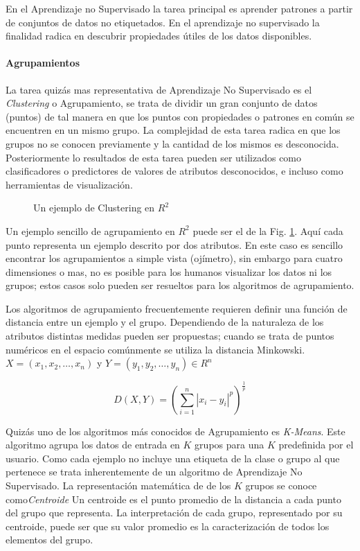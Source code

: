 En el Aprendizaje no Supervisado la tarea principal es aprender patrones a partir de conjuntos de datos no etiquetados. En el aprendizaje no supervisado la finalidad radica en descubrir propiedades útiles de los datos disponibles.

\paragraph{Agrupamientos}

La tarea quizás mas representativa de Aprendizaje No Supervisado es el \textit{Clustering} o Agrupamiento, se trata de dividir un gran conjunto de datos (puntos) de tal manera en que los puntos con propiedades o patrones en común se encuentren en un mismo grupo. La complejidad de esta tarea radica en que los grupos no se conocen previamente y la cantidad de los mismos es desconocida. Posteriormente lo resultados de esta tarea pueden ser utilizados como clasificadores o predictores de valores de atributos desconocidos, e incluso como herramientas de visualización. \cite{kubat_introduction_2017}

 \begin{figure}[htbp]
   \centering
   
    \caption{Un ejemplo de Clustering en $R^2$}
    \label{fig:clustering-example}
\end{figure}

Un ejemplo sencillo de agrupamiento en $R^2$ puede ser el de la Fig. \ref{fig:clustering-example}. Aquí cada punto representa un ejemplo descrito por dos atributos. En este caso es sencillo encontrar los agrupamientos a simple vista (ojímetro), sin embargo para cuatro dimensiones o mas, no es posible para los humanos visualizar los datos ni los grupos; estos casos solo pueden ser resueltos para los algoritmos de agrupamiento. \cite{kubat_introduction_2017}

Los algoritmos de agrupamiento frecuentemente requieren definir una función de distancia entre un ejemplo y el grupo. Dependiendo de la naturaleza de los atributos distintas medidas pueden ser propuestas; cuando se trata de puntos numéricos en el espacio comúnmente se utiliza la distancia Minkowski. $X = (x_1,x_2,\ldots,x_n)$ y $Y=(y_1,y_2,\ldots ,y_n) \in R^n$
 
$$D(X,Y) = (\sum_{i=1}^{n}|x_{i}-y_{i}|^{p})^{\frac{1}{p}}$$

Quizás uno de los algoritmos más conocidos de Agrupamiento es \textit{K-Means}. Este algoritmo agrupa los datos de entrada en $K$ grupos para una $K$ predefinida por el usuario. Como cada ejemplo no incluye una etiqueta de la clase o grupo al que pertenece se trata inherentemente de un algoritmo de Aprendizaje No Supervisado. La representación matemática de de los $K$ grupos se conoce como\textit{Centroide} Un centroide es el punto promedio de la distancia a cada punto del grupo que representa. La interpretación de cada grupo, representado por su centroide, puede ser que su valor promedio es la caracterización de todos los elementos del grupo.

